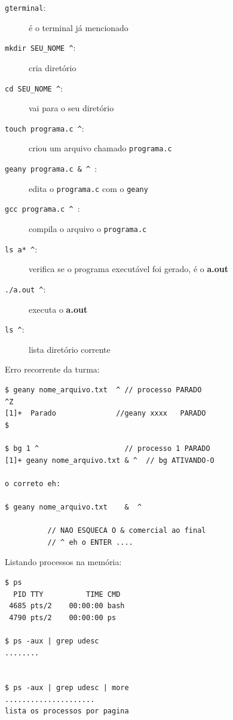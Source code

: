 \documentclass[final,a4paper]{article}
\begin{document}
\begin{description}
\begin{description}
  \item[ \texttt{gterminal}:] é o terminal já mencionado
    \item[ \texttt{mkdir SEU\_NOME \^}:] cria diretório
        \item[ \texttt{cd SEU\_NOME \^}:] vai para o seu diretório
        \item[ \texttt{touch programa.c \^}:] criou um arquivo chamado \texttt{programa.c}
        \item[ \texttt{geany programa.c \& \^ }:] edita o \texttt{programa.c} com o \texttt{geany}
       \item[ \texttt{gcc programa.c \^ }:] compila o arquivo o \texttt{programa.c} 
    \item[  \texttt{ls a* \^}:] verifica se o programa executável foi gerado, é o \textbf{a.out}  
    \item[  \texttt{./a.out \^}:] executa o \textbf{a.out}  
    \item[  \texttt{ls \* \^}:] lista diretório corrente
       
\end{description}


\pagebreak
\item[\ding{248}] Erro recorrente da turma:



\begin{verbatim}
$ geany nome_arquivo.txt  ^ // processo PARADO
^Z
[1]+  Parado              //geany xxxx   PARADO
$

$ bg 1 ^                    // processo 1 PARADO
[1]+ geany nome_arquivo.txt & ^  // bg ATIVANDO-O

o correto eh:

$ geany nome_arquivo.txt    &  ^   
          
          // NAO ESQUECA O & comercial ao final 
          // ^ eh o ENTER ....

\end{verbatim}


\pagebreak
\item[\ding{248}] Listando processos na memória:
\begin{verbatim}
$ ps 
  PID TTY          TIME CMD
 4685 pts/2    00:00:00 bash
 4790 pts/2    00:00:00 ps

$ ps -aux | grep udesc
........


$ ps -aux | grep udesc | more
.....................
lista os processos por pagina


\end{verbatim}
\end{description}
\end{document}
